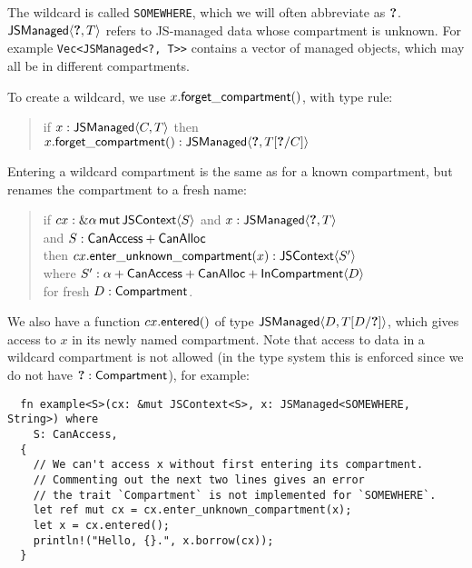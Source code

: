 The wildcard is called \verb|SOMEWHERE|, which we will
often abbreviate as $\textbf{?}$.
$\mathsf{JSManaged}\langle \textbf{?}, T\rangle$ refers to JS-managed data whose
compartment is unknown. For example \verb|Vec<JSManaged<?, T>>|
contains a vector of managed objects, which may all be in different
compartments.

To create a wildcard, we use $x.\mathsf{forget\_compartment}()$, with type
rule:
\begin{quote}
  if $x: \mathsf{JSManaged}\langle C,T\rangle$ 
  then $x.\mathsf{forget\_compartment}(): \mathsf{JSManaged}\langle \textbf{?},T[\textbf{?}/C]\rangle$
\end{quote}
Entering a wildcard compartment is the same as for a known compartment,
but renames the compartment to a fresh name:
\begin{quote}
  if $cx: \&\alpha\,\mathsf{mut}\,{\mathsf{JSContext}\langle S\rangle}$
  and $x: \mathsf{JSManaged}\langle \textbf{?},T\rangle$ \\
  and $S: \mathsf{CanAccess} + \mathsf{CanAlloc}$ \\
  then $cx.\mathsf{enter\_unknown\_compartment}(x) : \mathsf{JSContext}\langle S'\rangle$ \\\mbox{}\quad
  where $S': \alpha + \mathsf{CanAccess} + \mathsf{CanAlloc} + \mathsf{InCompartment}\langle D\rangle$ \\\mbox{}\qquad
  for fresh $D: \mathsf{Compartment}$.
\end{quote}
We also have a function $cx.\mathsf{entered}()$ of type $\mathsf{JSManaged}\langle D,T[D/\textbf{?}]\rangle$,
which gives access to $x$ in its newly named compartment.
Note that access to data in a wildcard compartment is not allowed
(in the type system this is enforced since we do not have $\textbf{?}:\mathsf{Compartment}$),
for example:
\begin{verbatim}
  fn example<S>(cx: &mut JSContext<S>, x: JSManaged<SOMEWHERE, String>) where
    S: CanAccess,
  {
    // We can't access x without first entering its compartment.
    // Commenting out the next two lines gives an error
    // the trait `Compartment` is not implemented for `SOMEWHERE`.
    let ref mut cx = cx.enter_unknown_compartment(x);
    let x = cx.entered();
    println!("Hello, {}.", x.borrow(cx));
  }
\end{verbatim}
